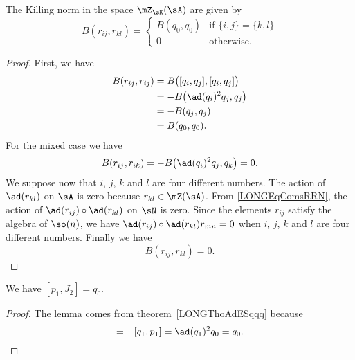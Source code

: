 \begin{proposition}
	The Killing norm in the space $\mZ_{\sK}(\sA)$ are given by
	\begin{equation}
		B(r_{ij},r_{kl})=\begin{cases}
			B(q_0,q_0) & \text{if }\{ i,j \}=\{ k,l \} \\
			0          & \text{otherwise}.
		\end{cases}
	\end{equation}
\end{proposition}

\begin{proof}
	First, we have
	\begin{equation}
		\begin{aligned}[]
			B(r_{ij},r_{ij}) & =B\big( [q_i,q_j],[q_i,q_j] \big) \\
			                 & =-B\big( \ad(q_i)^2q_j,q_j \big)  \\
			                 & =-B(q_j,q_j)                      \\
			                 & =B(q_0,q_0).
		\end{aligned}
	\end{equation}
	For the mixed case we have
	\begin{equation}
		B(r_{ij},r_{ik})=-B\big( \ad(q_i)^2q_j,q_k \big)=0.
	\end{equation}
	We suppose now that $i$, $j$, $k$ and $l$ are four different numbers. The action of $\ad(r_{kl})$ on $\sA$ is zero because $r_{kl}\in\mZ(\sA)$. From \eqref{LONGEqComsRRN}, the action of $\ad(r_{ij})\circ\ad(r_{kl})$ on $\sN$ is zero. Since the elements $r_{ij}$ satisfy the algebra of $\so(n)$, we have $\ad(r_{ij})\circ\ad(r_{kl})r_{mn}=0$ when $i$, $j$, $k$ and $l$ are four different numbers. Finally we have
	\begin{equation}
		B(r_{ij},r_{kl})=0.
	\end{equation}
\end{proof}

\begin{lemma}		\label{LONGLempunjdeuxqzero}
	We have $[p_1,J_2]=q_0$.
\end{lemma}

\begin{proof}
	The lemma comes from theorem~\ref{LONGThoAdESqqq} because
	\begin{equation}
		[p_1,J_2]=-[q_1,p_1]=\ad(q_1)^2q_0=q_0.
	\end{equation}
\end{proof}

